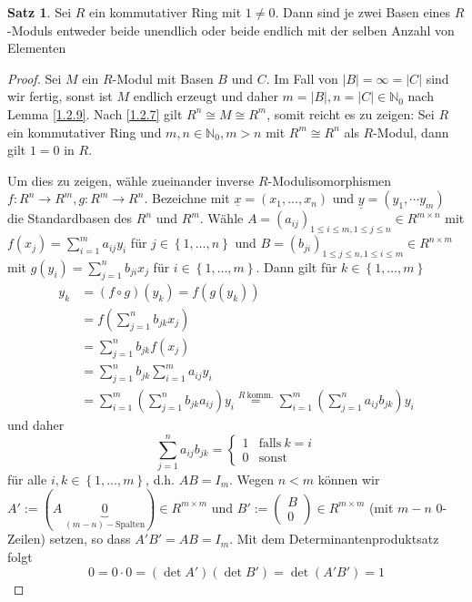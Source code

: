 \documentclass[
twoside=semi,
fontsize=12,
DIV=12, 
cleardoublepage=current,
leqno,
headings=optiontoheadandtoc, 
toc=idx
]{scrbook}
\newcommand{\N}{\mathbb{N}}
\newcommand{\brac}[1]{\left( #1 \right)}
\newcommand{\set}[1]{\left\{ #1 \right\}}
\theoremstyle{definition}
\newtheorem{satz}[definition]{Satz}
\begin{document}
	\begin{satz}\label{1.2.11}\hfill\newline
		Sei $R$ ein kommutativer Ring mit $1 \neq 0$. Dann sind je zwei Basen eines $R$-Moduls entweder beide unendlich oder beide endlich mit der selben Anzahl von Elementen
		
		\begin{proof}
			Sei $M$ ein $R$-Modul mit Basen $B$ und $C$. Im Fall von $|B| =  \infty = |C|$ sind wir fertig, sonst ist $M$ endlich erzeugt und daher $m = |B|, n = |C| \in \N_0$ nach Lemma \ref{1.2.9}. Nach \ref{1.2.7} gilt $R^n \cong M \cong R^m$, somit reicht es zu zeigen: Sei $R$ ein kommutativer Ring und $m, n \in \N_0, m > n$ mit $R^m \cong R^n$ als $R$-Modul, dann gilt $1 = 0$ in $R$. 
			
			\noindent Um dies zu zeigen, w\"ahle zueinander inverse $R$-Modulisomorphismen $f:R^n \to R^m, g: R^m \to R^n$. Bezeichne mit $\underline{x} = (x_1, \dots, x_n)$ und $\underline{y} = (y_1, \dotsm y_m)$ die Standardbasen des $R^n$ und $R^m$. W\"ahle $A=(a_{ij})_{1\leq i \leq m, 1 \leq j \leq n}\in R^{m \times n}$ mit $\displaystyle f(x_j) = \sum_{i=1}^m a_{ij}y_i$ f\"ur $j \in \set{1, \dots, n}$ und $B = (b_{ji})_{1 \leq j \leq n, 1 \leq i \leq m} \in R^{n \times m}$ mit $\displaystyle g(y_i) = \sum_{j=1}^n b_{ji}x_j$ f\"ur $i \in \set{1, \dots, m}$. Dann gilt f\"ur $k \in \set{1, \dots, m}$
				\begin{align*}
					y_k &= (f \circ g)(y_k) = f(g(y_k))\\
					&= f\brac{\sum_{j=1}^n b_{jk}x_j}\\
					&= \sum_{j=1}^n b_{jk}f(x_j)\\
					&= \sum_{j=1}^n b_{jk}\sum_{i=1}^ma_{ij}y_i\\
					&= \sum_{i=1}^m\brac{\sum_{j=1}^n b_{jk}a_{ij} }y_i \overset{R\ \mathrm{komm.}}{=} \sum_{i=1}^m\brac{\sum_{j=1}^n a_{ij}b_{jk} }y_i
				\end{align*} 
			und daher
			\[\sum_{j=1}^n a_{ij}b_{jk} = \begin{cases}
				1 & \mathrm{falls }\ k = i\\
				0 & \mathrm{sonst}
			\end{cases}\] 
			f\"ur alle $i, k \in \set{1, \dots, m}$, d.h. $AB = I_m$.\newline
			Wegen $n < m$ k\"onnen wir $\displaystyle A' := (A\ \underbrace{0}_{(m-n)-\mathrm{Spalten}}) \in R^{m\times m}$ und $B' := \begin{pmatrix}
				B\\0
			\end{pmatrix} \in R^{m \times m}$ (mit $m-n$ $0$-Zeilen) setzen, so dass $A'B' = AB = I_m$. \newline
			Mit dem Determinantenproduktsatz folgt 
			\[0 = 0\cdot 0 = (\det A')(\det B') = \det(A'B') = 1\] 
		\end{proof}
	\end{satz}
\end{document}
